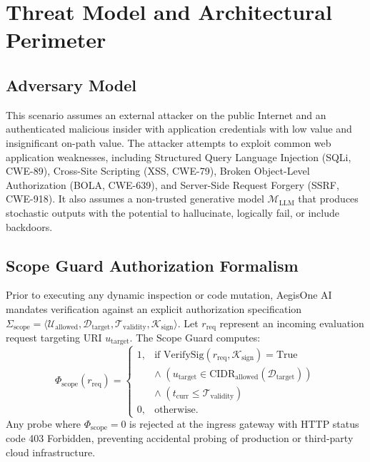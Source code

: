 \documentclass[journal,twoside]{IEEEtran}
\begin{document}
\section{Threat Model and Architectural Perimeter}
\subsection{Adversary Model}
This scenario assumes an external attacker on the public Internet and an authenticated malicious insider with application credentials with low value and insignificant on-path value. The attacker attempts to exploit common web application weaknesses, including Structured Query Language Injection (SQLi, CWE-89), Cross-Site Scripting (XSS, CWE-79), Broken Object-Level Authorization (BOLA, CWE-639), and Server-Side Request Forgery (SSRF, CWE-918). It also assumes a non-trusted generative model $\mathcal{M}_{\text{LLM}}$ that produces stochastic outputs with the potential to hallucinate, logically fail, or include backdoors.

\subsection{Scope Guard Authorization Formalism}
Prior to executing any dynamic inspection or code mutation, AegisOne AI mandates verification against an explicit authorization specification $\Sigma_{\text{scope}} = \langle \mathcal{U}_{\text{allowed}}, \mathcal{D}_{\text{target}}, \mathcal{T}_{\text{validity}}, \mathcal{K}_{\text{sign}} \rangle$. Let $r_{\text{req}}$ represent an incoming evaluation request targeting URI $u_{\text{target}}$. The Scope Guard computes:
\begin{equation}
\Phi_{\text{scope}}(r_{\text{req}}) = 
\begin{cases}
1, & \text{if } \text{VerifySig}(r_{\text{req}}, \mathcal{K}_{\text{sign}}) = \text{True} \\
   & \wedge \; (u_{\text{target}} \in \text{CIDR}_{\text{allowed}}(\mathcal{D}_{\text{target}})) \\
   & \wedge \; (t_{\text{curr}} \le \mathcal{T}_{\text{validity}}) \\
0, & \text{otherwise}.
\end{cases}
\end{equation}
Any probe where $\Phi_{\text{scope}} = 0$ is rejected at the ingress gateway with HTTP status code 403 Forbidden, preventing accidental probing of production or third-party cloud infrastructure.
\end{document}
